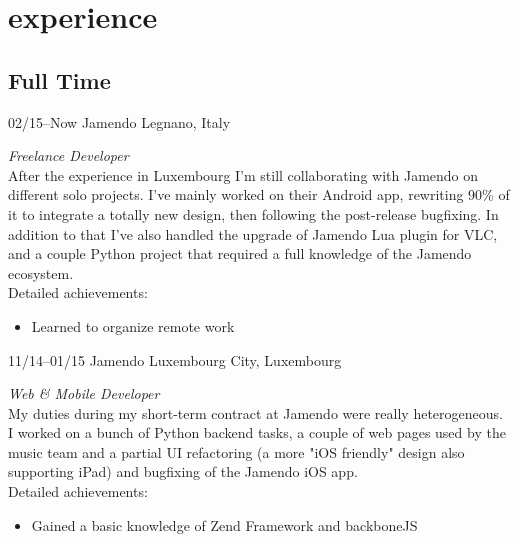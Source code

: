 \documentclass[]{friggeri-cv} %
\begin{document}

\section{experience}

\subsection{Full Time}

\begin{entrylist}


\entry
{02/15--Now}
{Jamendo}
{Legnano, Italy}
{\emph{Freelance Developer} \\
After the experience in Luxembourg I'm still collaborating with Jamendo on different solo projects. I've mainly worked on their Android app, rewriting 90\% of it to integrate a totally new design, then following the post-release bugfixing. In addition to that I've also handled the upgrade of Jamendo Lua plugin for VLC, and a couple Python project that required a full knowledge of the Jamendo ecosystem. \\
Detailed achievements:
\begin{itemize}
  \item Learned to organize remote work
\end{itemize}}


\entry
{11/14--01/15}
{Jamendo}
{Luxembourg City, Luxembourg}
{\emph{Web \& Mobile Developer} \\
My duties during my short-term contract at Jamendo were really heterogeneous. I worked on a bunch of Python backend tasks, a couple of web pages used by the music team and a partial UI refactoring (a more "iOS friendly" design also supporting iPad) and bugfixing of the Jamendo iOS app. \\
Detailed achievements:
\begin{itemize}
  \item Gained a basic knowledge of Zend Framework and backboneJS
\end{itemize}}



\end{entrylist}
\end{document}
